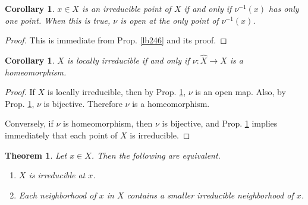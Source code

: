 \documentclass[12pt,b5paper,notitlepage]{report}
\theoremstyle{definition}
\theoremstyle{plain}
\newtheorem{thm}[df]{Theorem}
\newtheorem{co}[df]{Corollary}
\newcommand{\wht}{\widehat}
\numberwithin{equation}{section}
\begin{document}
\begin{co}\label{lb247}
$x\in X$ is an irreducible point of $X$ if and only if $\nu^{-1}(x)$ has only one point. When this is true, $\nu$ is open at the only point of $\nu^{-1}(x)$.
\end{co}
\begin{proof}
This is immediate from Prop. \ref{lb246} and its proof.
\end{proof}

\begin{co}
$X$ is locally irreducible if and only if $\nu:\wht X\rightarrow X$ is a homeomorphism.
\end{co}

\begin{proof}
If $X$ is locally irreducible, then by Prop. \ref{lb247}, $\nu$ is an open map. Also, by Prop. \ref{lb247}, $\nu$ is bijective. Therefore $\nu$ is a homeomorphism.

Conversely, if $\nu$ is homeomorphism, then $\nu$ is bijective, and Prop. \ref{lb247} implies immediately that each point of $X$ is irreducible.
\end{proof}






\begin{thm}\label{lb248}
Let $x\in X$. Then the following are equivalent.
\begin{enumerate}[label=(\arabic*)]
\item $X$ is irreducible at $x$.
\item Each neighborhood of $x$ in $X$ contains a smaller irreducible neighborhood of $x$.
\end{enumerate}
\end{thm}
\end{document}
